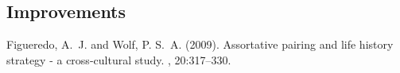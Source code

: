 \documentclass[12pt]{article} %
\begin{document}
\subsection{Improvements}

\vfill

\begin{thebibliography}{99} %

Figueredo, A.~J. and Wolf, P. S.~A. (2009).
\newblock Assortative pairing and life history strategy - a cross-cultural
  study.
, 20:317--330.
 
\end{thebibliography}

\end{document}
